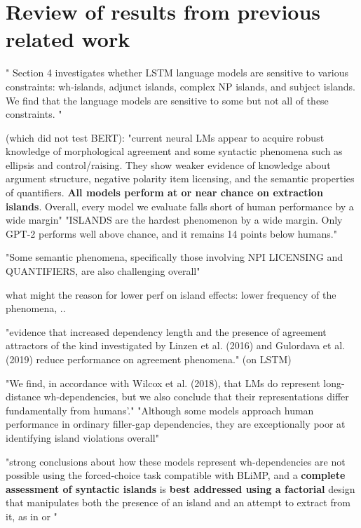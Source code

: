 \section{Review of results from previous related work}

" Section 4 investigates whether
LSTM language models are sensitive to various
constraints: wh-islands, adjunct islands, complex
NP islands, and subject islands. We find that the
language models are sensitive to some but not all
of these constraints. " \citep{wilcox2018rnn}

\citet{warstadt2020blimp} (which did not test BERT): "current neural LMs appear to acquire robust
knowledge of morphological agreement and some syntactic phenomena such as ellipsis and control/raising. They show weaker evidence of knowledge about argument structure, negative polarity item licensing, and the semantic properties of quantifiers. \textbf{All models perform at or near chance on extraction islands}. Overall, every model we evaluate falls short of human performance by a wide margin"
"ISLANDS are the hardest phenomenon by a wide margin. Only GPT-2 performs well above
chance, and it remains 14 points below humans." \citet{warstadt2020blimp}

"Some semantic phenomena, specifically those involving NPI LICENSING and QUANTIFIERS, are also challenging overall"

what might the reason for lower perf on island effects: lower frequency of the phenomena, ..

"evidence that increased dependency length and the presence of agreement attractors of the kind investigated by Linzen et al. (2016) and Gulordava et al. (2019) reduce performance on agreement phenomena." (on LSTM) \citet{warstadt2020blimp}

"We find, in accordance with Wilcox et al.
(2018), that LMs do represent long-distance
wh-dependencies, but we also conclude that
their representations differ fundamentally from humans’." \citet{warstadt2020blimp}
"Although some models approach human
performance in ordinary filler-gap dependencies,
they are exceptionally poor at identifying island
violations overall" \citet{warstadt2020blimp}

"strong conclusions about how these models represent wh-dependencies are not possible using the forced-choice task compatible with BLiMP, and
a \textbf{complete assessment of syntactic islands} is \textbf{best
	addressed using a factorial} design that manipulates
both the presence of an island and an attempt to
extract from it, as in \citet{kush2018investigating} or  \citet{wilcox2018rnn}" \citep{warstadt2020blimp}


